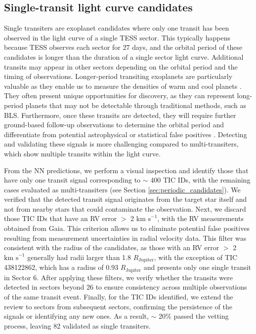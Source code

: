 \subsection{Single-transit light curve candidates}
\label{sec:single_candidates}
Single transiters are exoplanet candidates where only one transit has been observed in the light curve of a single TESS sector. This typically happens because TESS observes each sector for 27 days, and the orbital period of these candidates is longer than the duration of a single sector light curve. Additional transits may appear in other sectors depending on the orbital period and the timing of observations. Longer-period transiting exoplanets are particularly valuable as they enable us to measure the densities of warm and cool planets \citep{wang2021aligned}. They often present unique opportunities for discovery, as they can represent long-period planets that may not be detectable through traditional methods, such as BLS. Furthermore, once these transits are detected, they will require further ground-based follow-up observations to determine the orbital period and differentiate from potential astrophysical or statistical false positives \citep{sullivan2015transiting}. Detecting and validating these signals is more challenging compared to multi-transiters, which show multiple transits within the light curve. \par

From the NN predictions, we perform a visual inspection and identify those that have only one transit signal corresponding to $\sim$ 400 TIC IDs, with the remaining cases evaluated as multi-transiters (see Section \ref{sec:periodic_candidates}). We verified that the detected transit signal originates from the target star itself and not from nearby stars that could contaminate the observation. Next, we discard those TIC IDs that have an RV error $>$ 2 $\text{km s}^{-1}$, with the RV measurements obtained from Gaia. This criterion allows us to eliminate potential false positives resulting from measurement uncertainties in radial velocity data. This filter was consistent with the radius of the candidates, as those with an RV error $>$ 2 $\text{km s}^{-1}$ generally had radii larger than 1.8 $R_{\mathrm{Jupiter}}$, with the exception of TIC 438122862, which has a radius of 0.93 $R_{\mathrm{Jupiter}}$ and presents only one single transit in Sector 6. After applying these filters, we verify whether the transits were detected in sectors beyond 26 to ensure consistency across multiple observations of the same transit event. Finally, for the TIC IDs identified, we extend the review to sectors from subsequent sectors, confirming the persistence of the signals or identifying any new ones. As a result, $\sim$ 20\% passed the vetting process, leaving 82 validated as single transiters.

